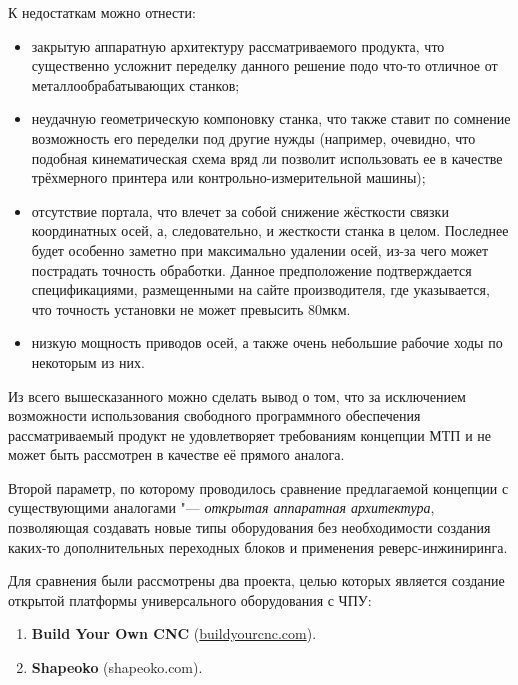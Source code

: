 К недостаткам можно отнести:
\begin{itemize}
	\item закрытую аппаратную архитектуру рассматриваемого продукта, что существенно усложнит переделку данного решение подо что-то отличное от металлообрабатывающих станков;
	
	\item неудачную геометрическую компоновку станка, что также ставит по сомнение возможность его переделки под другие нужды (например, очевидно, что подобная кинематическая схема вряд ли позволит использовать ее в качестве трёхмерного принтера или контрольно-измерительной машины);
	
	\item отсутствие портала, что влечет за собой снижение жёсткости связки координатных осей, а, следовательно, и жесткости станка в целом. Последнее будет особенно заметно при максимально удалении осей, из-за чего может пострадать точность обработки. Данное предположение подтверждается спецификациями, размещенными на сайте производителя, где указывается, что точность установки не может превысить 80мкм.
	
	\item низкую мощность приводов осей, а также очень небольшие рабочие ходы по некоторым из них.
	
	
\end{itemize}
Из всего вышесказанного можно сделать вывод о том, что за исключением возможности использования свободного программного обеспечения рассматриваемый продукт не удовлетворяет требованиям концепции МТП и не может быть рассмотрен в качестве её прямого аналога.

Второй параметр, по которому проводилось сравнение предлагаемой концепции с существующими аналогами "--- \textit{открытая аппаратная архитектура}, позволяющая создавать новые типы оборудования без необходимости создания каких-то дополнительных переходных блоков и применения реверс-инжиниринга.

Для сравнения были рассмотрены два проекта, целью которых является создание открытой платформы универсального оборудования с ЧПУ:

\begin{enumerate}
	\item \foreignlanguage{english}{\textbf{Build Your Own CNC}} (\href{https://www.buildyourcnc.com/cnckit2.aspx}{\foreignlanguage{english}{buildyourcnc.com}}).
	
	\item \textbf{Shapeoko} (shapeoko.com).
\end{enumerate}

